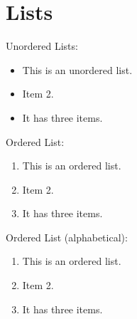 		
		
		
		
		
		
		
		
		
		
		
		
		
		
		
		
		
		
		
		
		
		
		
		
		
		
		
		
		
		
		
		
		
		
		
		
		
		
		
		
		
		
		
		
		
		
		
		
		
		
		
		
		
		
		
		
		
	
\section{Lists}

Unordered Lists:
\begin{itemize}
\item This is an unordered list. 
\item Item 2.
\item It has three items.
\end{itemize}

Ordered List:
\begin{enumerate}
\item This is an ordered list.
\item Item 2.
\item It has three items.
\end{enumerate}

Ordered List (alphabetical):
\begin{enumerate}[label=\Alph*.]
\item This is an ordered list.
\item Item 2.
\item It has three items.
\end{enumerate}

